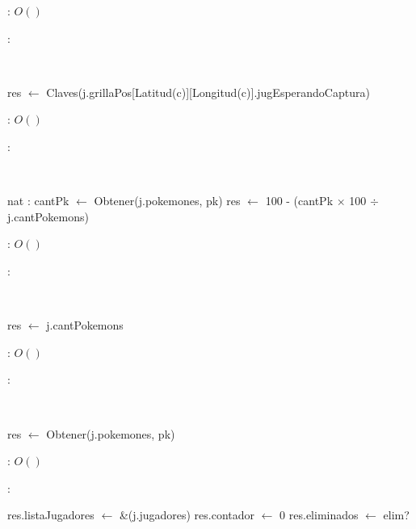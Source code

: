 \begin{Algoritmos}
	\complejidad: $O()$

	\justifcomp:

	~

	\begin{algorithm}[H]
		\NoCaptionOfAlgo
		\caption{}
		res $\leftarrow$ Claves(j.grillaPos[Latitud(c)][Longitud(c)].jugEsperandoCaptura)
	\end{algorithm}

	\complejidad: $O()$

	\justifcomp:

	~

	\begin{algorithm}[H]
		\NoCaptionOfAlgo
		\caption{}
		nat : cantPk $\leftarrow$ Obtener(j.pokemones, pk)\;
		res $\leftarrow$ 100 - (cantPk $\times$ 100 $\div$ j.cantPokemons)\;
	\end{algorithm}

	\complejidad: $O()$

	\justifcomp:

	~

	\begin{algorithm}[H]
		\NoCaptionOfAlgo
		\caption{}
		res $\leftarrow$ j.cantPokemons\;
	\end{algorithm}

	\complejidad: $O()$

	\justifcomp:

	~

	\begin{algorithm}[H]
		\NoCaptionOfAlgo
		\caption{}
		res $\leftarrow$ Obtener(j.pokemones, pk)\; 
	\end{algorithm}

	\complejidad: $O()$

	\justifcomp:



	\begin{algorithm}[H]
		\NoCaptionOfAlgo
		\caption{}
		res.listaJugadores $\leftarrow$ \&(j.jugadores)
		res.contador $\leftarrow$ 0
		res.eliminados $\leftarrow$ elim?
	\end{algorithm}


\end{Algoritmos}

